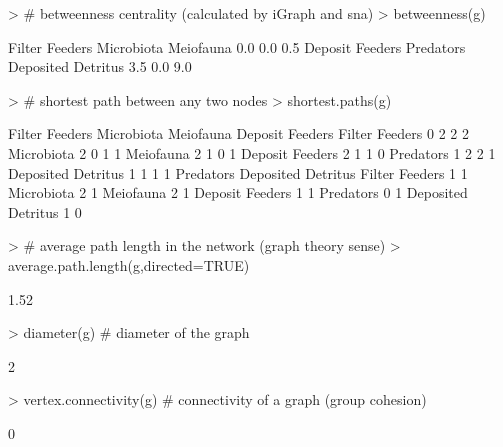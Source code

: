 \documentclass[article]{jss}
\begin{document}
\begin{Schunk}
\begin{Sinput}
> # betweenness centrality (calculated by iGraph and sna)
> betweenness(g)
\end{Sinput}
\begin{Soutput}
    Filter Feeders         Microbiota          Meiofauna 
               0.0                0.0                0.5 
   Deposit Feeders          Predators Deposited Detritus 
               3.5                0.0                9.0 
\end{Soutput}
\begin{Sinput}
> # shortest path between any two nodes
> shortest.paths(g)
\end{Sinput}
\begin{Soutput}
                   Filter Feeders Microbiota Meiofauna Deposit Feeders
Filter Feeders                  0          2         2               2
Microbiota                      2          0         1               1
Meiofauna                       2          1         0               1
Deposit Feeders                 2          1         1               0
Predators                       1          2         2               1
Deposited Detritus              1          1         1               1
                   Predators Deposited Detritus
Filter Feeders             1                  1
Microbiota                 2                  1
Meiofauna                  2                  1
Deposit Feeders            1                  1
Predators                  0                  1
Deposited Detritus         1                  0
\end{Soutput}
\begin{Sinput}
> # average path length in the network (graph theory sense)
> average.path.length(g,directed=TRUE)
\end{Sinput}
\begin{Soutput}
[1] 1.52
\end{Soutput}
\begin{Sinput}
> diameter(g)  # diameter of the graph
\end{Sinput}
\begin{Soutput}
[1] 2
\end{Soutput}
\begin{Sinput}
> vertex.connectivity(g)  # connectivity of a graph (group cohesion)
\end{Sinput}
\begin{Soutput}
[1] 0
\end{Soutput}
\begin{Sinput}

\end{Sinput}
\end{Schunk}
\end{document}
